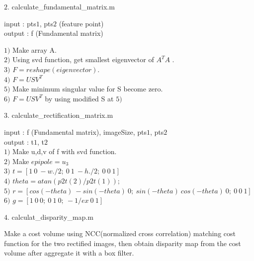 {\large $2.$ calculate\_fundamental\_matrix.m \par}
\tab input : pts$1$, pts$2$ (feature point) \\
\tab output : f (Fundamental matrix)

\tab $1)$ Make array A. \\
\tab $2)$ Using svd function, get smallest eigenvector of $A^TA$ . \\
\tab $3)$ $F=reshape(eigenvector)$.\\
\tab $4)$ $F=USV^T$ \\
\tab $5)$ Make minimum singular value for S become zero. \\
\tab $6)$ $F=USV^T$ by using modified S at $5)$ \\

\newpage
{\large $3.$ calculate\_rectification\_matrix.m \par}
\tab input : f (Fundamental matrix), imageSize, pts$1$, pts$2$ \\
\tab output : t$1$, t$2$ \\

\tab $1)$ Make u,d,v of f with svd function. \\
\tab $2)$ Make $epipole = u_3$ \\
\tab $3)$ $t = [1\ 0\ -w./2;\ 0\ 1\ -h./2;\ 0\ 0\ 1]$ \\
\tab $4)$ $theta = atan(p2t(2)/p2t(1));$ \\
\tab $5)$ $r = [cos(-theta)\ -sin(-theta)\ 0;\ sin(-theta)\ cos(-theta)\ 0;\ 0\ 0\ 1]$ \\
\tab $6)$ $g = [1\ 0\ 0;\ 0\ 1\ 0;\ -1/ex\ 0\ 1]$ \\

{\large $4.$ calculat\_disparity\_map.m \par}
\tab Make a cost volume using NCC(normalized cross correlation) matching cost function for the two rectified images, then obtain disparity map from the cost volume after aggregate it with a box filter. \\\\


